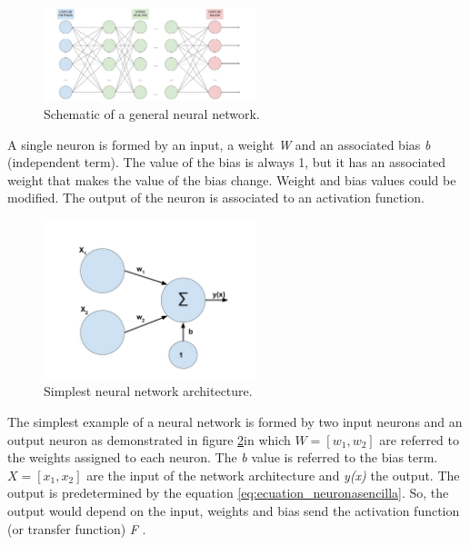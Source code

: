 \begin{figure}[htb]
\centering
\includegraphics[width=0.55\textwidth]{images_miscelaneus/red_neuronal.jpg}
\caption{Schematic of a general neural network.} \label{fig:esquemaneuronal}
\end{figure}

A single neuron is formed by an input, a weight \textit{W} and an associated bias \textit{b} (independent term). The value of the bias is always 1, but it has an associated weight that makes the value of the bias change. Weight and bias values could be modified. The output of the neuron is associated to an activation function. \\

\begin{figure}[htb]
\centering
\includegraphics[width=0.55\textwidth]{images_miscelaneus/neurona_sencilla.jpg}
\caption{Simplest neural network architecture.} \label{fig:neuronasencilla}
\end{figure}

The simplest example of a neural network is formed by two input neurons and an output neuron as demonstrated in figure \ref{fig:neuronasencilla}in which \textit{$W=[w_1,w_2]$} are referred to the weights assigned to each neuron. The \textit{b} value is referred to the bias term. \textit{$X=[x_{1},x_{2}]$} are the input of the network architecture and \textit{y(x)} the output. The output is predetermined by the equation \ref{eq:ecuation_neuronasencilla}. So, the output would depend on the input, weights and bias send the activation function (or transfer function) \textit{F} \cite{krose}. \\


